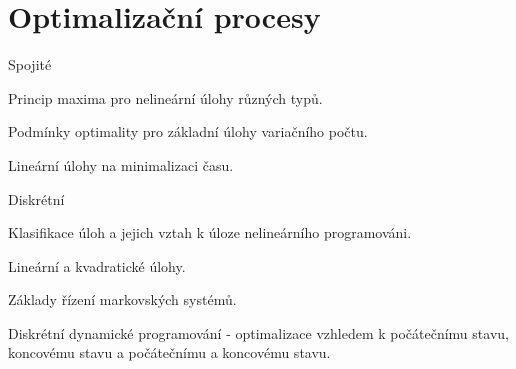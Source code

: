 \newpage
\section{Optimalizační procesy}
\begin{pozadavky}
\begin{pitemize}
\item Spojité
\begin{pitemize}
\item Princip maxima pro nelineární úlohy různých typů.
\item Podmínky optimality pro základní úlohy variačního počtu.
\item Lineární úlohy na minimalizaci času.
\end{pitemize}
\item Diskrétní
\begin{pitemize}
\item Klasifikace úloh a jejich vztah k úloze nelineárního programováni.
\item Lineární a kvadratické úlohy.
\item Základy řízení markovských systémů.
\item Diskrétní dynamické programování - optimalizace vzhledem k počátečnímu stavu, koncovému stavu a počátečnímu a koncovému stavu.
\end{pitemize}
\end{pitemize}
\end{pozadavky}